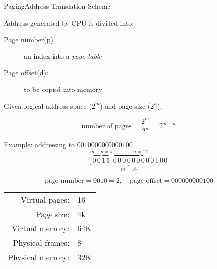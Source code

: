 \begin{frame}{Paging}{Address Translation Scheme}
  \begin{iblock}{Address generated by CPU is divided into:}
    \begin{description}
    \item[Page number(p):] an index into a \emph{page table}
    \item[Page offset(d):] to be copied into memory
    \end{description}
  \end{iblock}
  Given \alert{logical address space} ($2^m$) and \alert{page size} ($2^n$),
  \begin{small}
    $$\text{number of pages}=\frac{2^m}{2^n}=2^{m-n}$$
  \end{small}
  \begin{iblock}{Example: addressing to $0010000000000100$}
    $$\underbrace{\overbrace{0\,0\,1\,0}^{m-n=4}\,\overbrace{0\,0\,0\,0\,0\,0\,0\,0\,0\,1\,0\,0}^{n=12}}_{m=16}$$
    \begin{small}
      $$\text{page number}=0010=2, \quad \text{page offset}=000000000100$$
    \end{small}
  \end{iblock}
\end{frame}

\begin{frame}
  \begin{varwidth}{.65\textwidth}
    \begin{center}
    \end{center}
    \label{fig:paging}
  \end{varwidth}\hfill
  \begin{varwidth}{.35\textwidth}
    \begin{small}
      \begin{tabular}{rl}
        Virtual pages:  &16\\
        Page size:      &4k\\
        Virtual memory:& 64K\\
        Physical frames:&8\\
        Physical memory:&32K
      \end{tabular}
    \end{small}
  \end{varwidth}
\end{frame}

